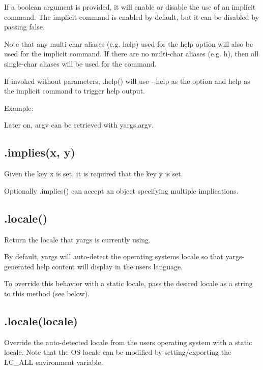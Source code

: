 If a boolean argument is provided, it will enable or disable the use of an implicit command. The implicit command is enabled by default, but it can be disabled by passing {\ttfamily false}.

Note that any multi-\/char aliases (e.\+g. {\ttfamily help}) used for the help option will also be used for the implicit command. If there are no multi-\/char aliases (e.\+g. {\ttfamily h}), then all single-\/char aliases will be used for the command.

If invoked without parameters, {\ttfamily .help()} will use {\ttfamily -\/-\/help} as the option and {\ttfamily help} as the implicit command to trigger help output.

Example\+:




Later on, {\ttfamily argv} can be retrieved with {\ttfamily yargs.\+argv}.

\subsection*{.implies(x, y) }

Given the key {\ttfamily x} is set, it is required that the key {\ttfamily y} is set.

Optionally {\ttfamily .implies()} can accept an object specifying multiple implications.

\subsection*{.locale() }

Return the locale that yargs is currently using.

By default, yargs will auto-\/detect the operating system\textquotesingle{}s locale so that yargs-\/generated help content will display in the user\textquotesingle{}s language.

To override this behavior with a static locale, pass the desired locale as a string to this method (see below).

\subsection*{.locale(locale) }

Override the auto-\/detected locale from the user\textquotesingle{}s operating system with a static locale. Note that the OS locale can be modified by setting/exporting the {\ttfamily L\+C\+\_\+\+A\+LL} environment variable.


